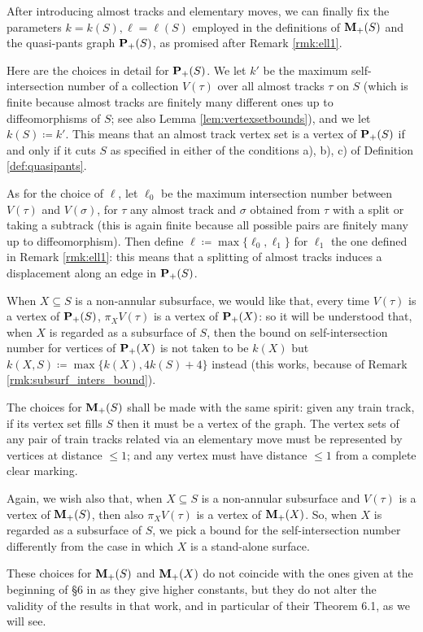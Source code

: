 \begin{rmk}\label{rmk:pickparameters}
After introducing almost tracks and elementary moves, we can finally fix the parameters $k=k(S),\ell=\ell(S)$ employed in the definitions of ${\mathbf{M}_+}(S)$ and the quasi-pants graph ${\mathbf{P}_+}(S)$, as promised after Remark \ref{rmk:ell1}.

Here are the choices in detail for ${\mathbf{P}_+}(S)$. We let $k'$ be the maximum self-intersection number of a collection $V(\tau)$ over all almost tracks $\tau$ on $S$ (which is finite because almost tracks are finitely many different ones up to diffeomorphisms of $S$; see also Lemma \ref{lem:vertexsetbounds}), and we let $k(S)\coloneqq k'$. This means that an almost track vertex set is a vertex of ${\mathbf{P}_+}(S)$ if and only if it cuts $S$ as specified in either of the conditions a), b), c) of Definition \ref{def:quasipants}.

As for the choice of $\ell$, let $\ell_0$ be the maximum intersection number between $V(\tau)$ and $V(\sigma)$, for $\tau$ any almost track and $\sigma$ obtained from $\tau$ with a split or taking a subtrack (this is again finite because all possible pairs are finitely many up to diffeomorphism). Then define $\ell\coloneqq\max\{\ell_0,\ell_1\}$ for $\ell_1$ the one defined in Remark \ref{rmk:ell1}: this means that a splitting of almost tracks induces a displacement along an edge in ${\mathbf{P}_+}(S)$.

When $X\subseteq S$ is a non-annular subsurface, we would like that, every time $V(\tau)$ is a vertex of ${\mathbf{P}_+}(S)$, $\pi_X V(\tau)$ is a vertex of ${\mathbf{P}_+}(X)$: so it will be understood that, when $X$ is regarded as a subsurface of $S$, then the bound on self-intersection number for vertices of ${\mathbf{P}_+}(X)$ is not taken to be $k(X)$ but $k(X,S)\coloneqq \max\{k(X),4k(S)+4\}$ instead (this works, because of Remark \ref{rmk:subsurf_inters_bound}).

The choices for ${\mathbf{M}_+}(S)$ shall be made with the same spirit: given any train track, if its vertex set fills $S$ then it must be a vertex of the graph. The vertex sets of any pair of train tracks related via an elementary move must be represented by vertices at distance $\leq 1$; and any vertex must have distance $\leq 1$ from a complete clear marking.

Again, we wish also that, when $X\subseteq S$ is a non-annular subsurface and $V(\tau)$ is a vertex of ${\mathbf{M}_+}(S)$, then also $\pi_X V(\tau)$ is a vertex of ${\mathbf{M}_+}(X)$. So, when $X$ is regarded as a subsurface of $S$, we pick a bound for the self-intersection number differently from the case in which $X$ is a stand-alone surface.

These choices for ${\mathbf{M}_+}(S)$ and ${\mathbf{M}_+}(X)$ do not coincide with the ones given at the beginning of \S 6 in \cite{mms} as they give higher constants, but they do not alter the validity of the results in that work, and in particular of their Theorem 6.1, as we will see.
\end{rmk}

